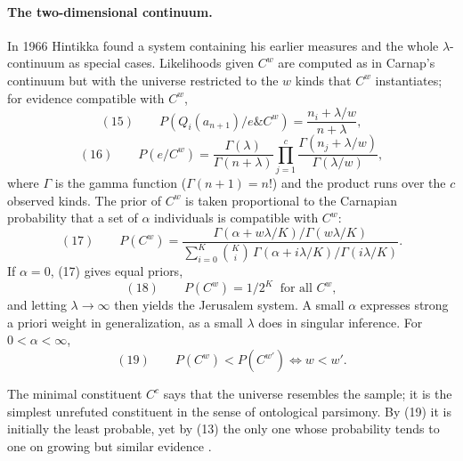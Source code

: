 \paragraph{The two-dimensional continuum.} In 1966 Hintikka found a
system containing his earlier measures and the whole
\(\lambda\)-continuum as special cases. Likelihoods given \(C^w\) are
computed as in Carnap's continuum but with the universe restricted to the
\(w\) kinds that \(C^w\) instantiates; for evidence compatible with
\(C^w\),
\[
 (15)\qquad P(Q_i(a_{n+1})/e\&C^w)=\frac{n_i+\lambda/w}{n+\lambda},
\]
\[
 (16)\qquad P(e/C^w)=\frac{\Gamma(\lambda)}{\Gamma(n+\lambda)}
   \prod_{j=1}^{c}\frac{\Gamma(n_j+\lambda/w)}{\Gamma(\lambda/w)},
\]
where \(\Gamma\) is the gamma function (\(\Gamma(n+1)=n!\)) and the
product runs over the \(c\) observed kinds. The prior of \(C^w\) is taken
proportional to the Carnapian probability that a set of \(\alpha\)
individuals is compatible with \(C^w\):
\[
 (17)\qquad P(C^w)=\frac{\Gamma(\alpha+w\lambda/K)/\Gamma(w\lambda/K)}
   {\sum_{i=0}^{K}\binom Ki\,\Gamma(\alpha+i\lambda/K)/\Gamma(i\lambda/K)}.
\]
If \(\alpha=0\), (17) gives equal priors,
\[
 (18)\qquad P(C^w)=1/2^K\ \text{ for all }C^w,
\]
and letting \(\lambda\to\infty\) then yields the Jerusalem system. A
small \(\alpha\) expresses strong a priori weight in generalization, as a
small \(\lambda\) does in singular inference. For \(0<\alpha<\infty\),
\[
 (19)\qquad P(C^w)<P(C^{w'})\iff w<w'.
\]
\cite[p.~320]{Niiniluoto2011HintikkaProgramReading}

The minimal constituent \(C^c\) says that the universe resembles the
sample; it is the simplest unrefuted constituent in the sense of
ontological parsimony. By (19) it is initially the least probable, yet by
(13) the only one whose probability tends to one on growing but similar
evidence \cite[p.~321]{Niiniluoto2011HintikkaProgramReading}.

